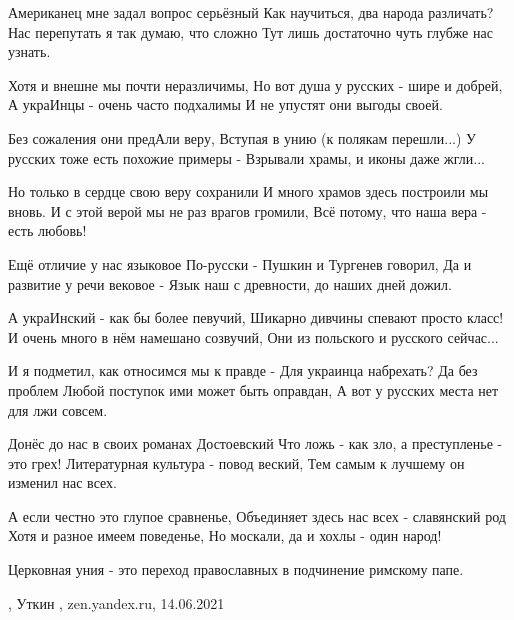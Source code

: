  
 
 
 
 
Американец мне задал вопрос серьёзный
Как научиться, два народа различать?
Нас перепутать я так думаю, что сложно
Тут лишь достаточно чуть глубже нас узнать.

Хотя и внешне мы почти неразличимы,
Но вот душа у русских - шире и добрей,
А украИнцы - очень часто подхалимы
И не упустят они выгоды своей.

Без сожаления они предАли веру,
Вступая в унию (к полякам перешли...)
У русских тоже есть похожие примеры -
Взрывали храмы, и иконы даже жгли...

Но только в сердце свою веру сохранили
И много храмов здесь построили мы вновь.
И с этой верой мы не раз врагов громили,
Всё потому, что наша вера - есть любовь!

Ещё отличие у нас языковое
По-русски - Пушкин и Тургенев говорил,
Да и развитие у речи вековое -
Язык наш с древности, до наших дней дожил.

А украИнский - как бы более певучий,
Шикарно дивчины спевают просто класс!
И очень много в нём намешано созвучий,
Они из польского и русского сейчас...

И я подметил, как относимся мы к правде -
Для украинца набрехать? Да без проблем
Любой поступок ими может быть оправдан,
А вот у русских места нет для лжи совсем.

Донёс до нас в своих романах Достоевский
Что ложь - как зло, а преступленье - это грех!
Литературная культура - повод веский,
Тем самым к лучшему он изменил нас всех.

А если честно это глупое сравненье,
Объединяет здесь нас всех - славянский род
Хотя и разное имеем поведенье,
Но москали, да и хохлы - один народ!

Церковная уния - это переход православных
в подчинение римскому папе.

, Уткин , zen.yandex.ru, 14.06.2021
